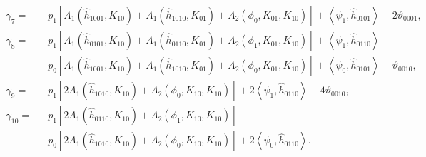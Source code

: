 \begin{equation}
\begin{aligned}
\gamma_7  ={}& - p_1 \left[A_1(\hat h_{1001},K_{10}) + A_1(\hat h_{1010},K_{01}) +  A_2(\phi_0,K_{01},K_{10})\right]
              + \left<\psi_1, \hat h_{0101} \right> - 2 \vartheta_{0001}, \\
\gamma_8 ={}& -p_1 \left[A_1(\hat h_{0101},K_{10}) + A_1(\hat h_{0110},K_{01}) + A_2(\phi_1,K_{01},K_{10})\right] + \left<\psi_1, \hat h_{0110} \right>\\
     & -p_0 \left[A_1(\hat h_{1001},K_{10}) + A_1(\hat h_{1010},K_{01}) + A_2(\phi_0,K_{01},K_{10})\right] + \left<\psi_0, \hat h_{0101}\right> - \vartheta_{0010},\\
\gamma_9 ={}& -p_1 \left[2 A_1(\hat h_{1010},K_{10}) + A_2(\phi_0,K_{10},K_{10})\right] + 2 \left<\psi_1, \hat h_{0110} \right> - 4 \vartheta_{0010}, \\
\gamma_{10} ={}& -p_1 \left[2 A_1(\hat h_{0110},K_{10}) + A_2(\phi_1,K_{10},K_{10})\right] \\
     & - p_0 \left[2 A_1(\hat h_{1010},K_{10}) + A_2(\phi_0,K_{10},K_{10})\right] + 2 \left<\psi_0, \hat h_{0110}\right>.
\end{aligned}
\end{equation}
\begin{align*}
\end{align*}

